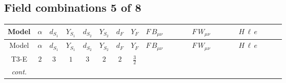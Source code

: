 \documentclass[8pt]{article}
\begin{document}
\begin{landscape}
\subsection*{Field combinations 5 of 8}
\begin{longtable}{@{}cccccccc >{\raggedright\arraybackslash}p{0.21\linewidth} >{\raggedright\arraybackslash}p{0.21\linewidth} >{\raggedright\arraybackslash}p{0.21\linewidth}@{}}
\toprule
Model & $\alpha$ & $d_{S_1}$ & $Y_{S_1}$ & $d_{S_2}$ & $Y_{S_2}$ & $d_F$ & $Y_F$ & $F\,B_{\mu\nu}$ & $F\,W_{\mu\nu}$ & $H\,\ell\,e$ \\
\midrule
\endfirsthead
\toprule
Model & $\alpha$ & $d_{S_1}$ & $Y_{S_1}$ & $d_{S_2}$ & $Y_{S_2}$ & $d_F$ & $Y_F$ & $F\,B_{\mu\nu}$ & $F\,W_{\mu\nu}$ & $H\,\ell\,e$ \\
\midrule
\endhead
T3-E & $2$ & $3$ & $1$ & $3$ & $2$ & $2$ & $\frac{3}{2}$ & \scriptsize\adjustbox{max width=\linewidth}{$\begin{gathered} -\frac{9}{2} \hbar  \log \left(\frac{\bar{\mu}^{2}}{M_F^2}\right) B_{\mu _1\mu _2}^2\end{gathered}$} & \scriptsize\adjustbox{max width=\linewidth}{$\begin{gathered} -\frac{1}{2} \hbar  \log \left(\frac{\bar{\mu}^{2}}{M_F^2}\right) \left(W_{\mu _1\mu _2}^{A_1}\right){}^2\end{gathered}$} & \scriptsize\adjustbox{max width=\linewidth}{$\begin{gathered} +\frac{\sqrt{3} \hbar  \overline{y_{1,i_3,r_1}} \overline{L_{a_1,i_2}}\, P_R\, e_{i_1} H_{a_1} y_{1,i_2,r_1} Y_{e,i_3,i_1}}{4 \epsilon } \\ +\frac{3}{8} \sqrt{3} \hbar  \overline{y_{1,i_3,r_1}} \overline{L_{a_1,i_2}}\, P_R\, e_{i_1} H_{a_1} y_{1,i_2,r_1} Y_{e,i_3,i_1} \\ +\frac{\sqrt{3} \hbar  \overline{y_{2,i_3,r_1}} \overline{L_{a_1,i_2}}\, P_R\, e_{i_1} H_{a_1} y_{2,i_2,r_1} Y_{e,i_3,i_1}}{4 \epsilon }\end{gathered}$} \\
\textit{cont.} &  &  &  &  &  &  &  &  &  & \scriptsize\adjustbox{max width=\linewidth}{$\begin{gathered} +\frac{3}{8} \sqrt{3} \hbar  \overline{y_{2,i_3,r_1}} \overline{L_{a_1,i_2}}\, P_R\, e_{i_1} H_{a_1} y_{2,i_2,r_1} Y_{e,i_3,i_1} \\ +\frac{\sqrt{3} \hbar  \overline{y_{1,i_1,r_1}} \overline{Y_{e,i_3,i_2}} \overline{e_{i_2}}\, P_L\, L_{a_1,i_1} y_{1,i_3,r_1} H_{a_1}{}^{\dagger }}{4 \epsilon } \\ +\frac{3}{8} \sqrt{3} \hbar  \overline{y_{1,i_1,r_1}} \overline{Y_{e,i_3,i_2}} \overline{e_{i_2}}\, P_L\, L_{a_1,i_1} y_{1,i_3,r_1} H_{a_1}{}^{\dagger }\end{gathered}$} \\

\end{longtable}
\end{landscape}
\end{document}
